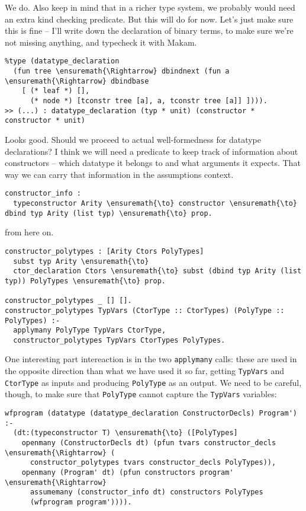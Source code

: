 \heroADVISOR{} We do. Also keep in mind that in a richer type system, we
probably would need an extra kind checking predicate. But this will do
for now. Let's just make sure this is fine -- I'll write down the
declaration of binary terms, to make sure we're not missing anything,
and typecheck it with Makam.

\begin{verbatim}
%type (datatype_declaration
  (fun tree \ensuremath{\Rightarrow} dbindnext (fun a \ensuremath{\Rightarrow} dbindbase
    [ (* leaf *) [],
      (* node *) [tconstr tree [a], a, tconstr tree [a]] ]))).
>> (...) : datatype_declaration (typ * unit) (constructor * constructor * unit)
\end{verbatim}

\heroSTUDENT{} Looks good. Should we proceed to actual well-formedness for
datatype declarations? I think we will need a predicate to keep track of
information about constructors -- which datatype it belongs to and what
arguments it expects. That way we can carry that information in the
assumptions context.

\begin{verbatim}
constructor_info :
  typeconstructor Arity \ensuremath{\to} constructor \ensuremath{\to} dbind typ Arity (list typ) \ensuremath{\to} prop.
\end{verbatim}

\TODO{} from here on.

\begin{verbatim}
constructor_polytypes : [Arity Ctors PolyTypes]
  subst typ Arity \ensuremath{\to}
  ctor_declaration Ctors \ensuremath{\to} subst (dbind typ Arity (list typ)) PolyTypes \ensuremath{\to} prop.

constructor_polytypes _ [] [].
constructor_polytypes TypVars (CtorType :: CtorTypes) (PolyType :: PolyTypes) :-
  applymany PolyType TypVars CtorType,
  constructor_polytypes TypVars CtorTypes PolyTypes.
\end{verbatim}

One interesting part intereaction is in the two \texttt{applymany}
calls: these are used in the opposite direction than what we have used
it so far, getting \texttt{TypVars} and \texttt{CtorType} as inputs and
producing \texttt{PolyType} as an output. We need to be careful, though,
to make sure that \texttt{PolyType} cannot capture the \texttt{TypVars}
variables:

\begin{verbatim}
wfprogram (datatype (datatype_declaration ConstructorDecls) Program') :-
  (dt:(typeconstructor T) \ensuremath{\to} ([PolyTypes]
    openmany (ConstructorDecls dt) (pfun tvars constructor_decls \ensuremath{\Rightarrow} (
      constructor_polytypes tvars constructor_decls PolyTypes)),
    openmany (Program' dt) (pfun constructors program' \ensuremath{\Rightarrow}
      assumemany (constructor_info dt) constructors PolyTypes
      (wfprogram program')))).
\end{verbatim}


